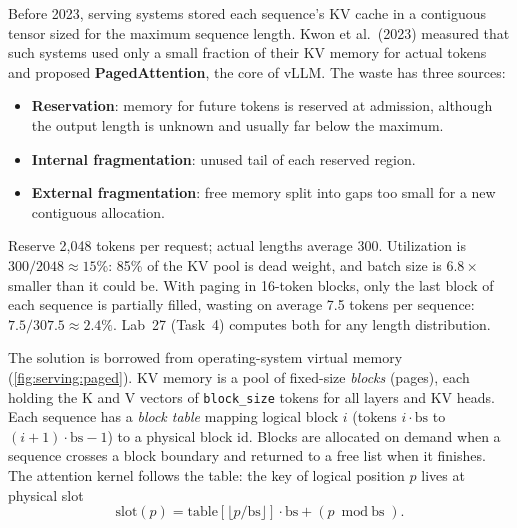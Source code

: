 Before 2023, serving systems stored each sequence's KV cache in a contiguous tensor sized for the
maximum sequence length. Kwon et al.\ (2023) measured that such systems used only a small fraction
of their KV memory for actual tokens and proposed \textbf{PagedAttention}, the core of vLLM. The
waste has three sources:
\begin{itemize}
  \item \textbf{Reservation}: memory for future tokens is reserved at admission, although the output
    length is unknown and usually far below the maximum.
  \item \textbf{Internal fragmentation}: unused tail of each reserved region.
  \item \textbf{External fragmentation}: free memory split into gaps too small for a new contiguous
    allocation.
\end{itemize}

\begin{napkinmath}
Reserve 2,048 tokens per request; actual lengths average 300. Utilization is $300/2048\approx15\%$:
85\% of the KV pool is dead weight, and batch size is $6.8\times$ smaller than it could be. With paging
in 16-token blocks, only the last block of each sequence is partially filled, wasting on average 7.5
tokens per sequence: $7.5/307.5\approx2.4\%$. Lab~27 (Task~4) computes both for any length distribution.
\end{napkinmath}

The solution is borrowed from operating-system virtual memory (\cref{fig:serving:paged}). KV memory
is a pool of fixed-size \emph{blocks} (pages), each holding the K and V vectors of \texttt{block\_size}
tokens for all layers and KV heads. Each sequence has a \emph{block table} mapping logical block $i$
(tokens $i\cdot\text{bs}$ to $(i+1)\cdot\text{bs}-1$) to a physical block id. Blocks are allocated
on demand when a sequence crosses a block boundary and returned to a free list when it finishes. The
attention kernel follows the table: the key of logical position $p$ lives at physical slot
\begin{equation}\label{eq:serving:slot}
  \text{slot}(p) = \text{table}[\lfloor p/\text{bs}\rfloor]\cdot\text{bs} + (p \bmod \text{bs}).
\end{equation}

